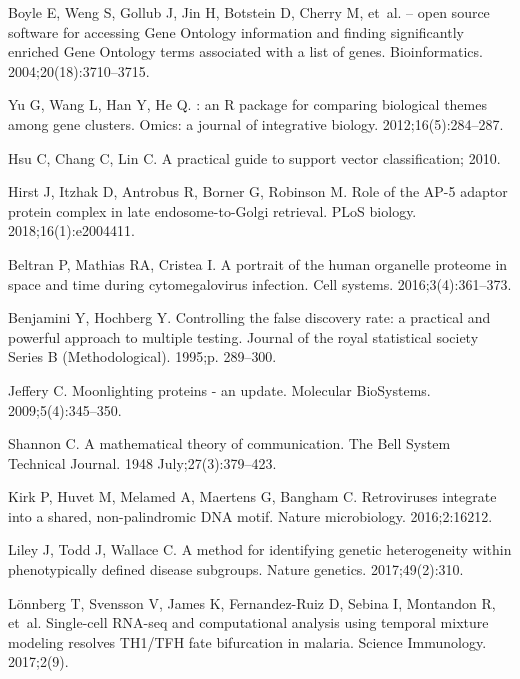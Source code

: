 \documentclass[10pt,letterpaper]{article}\usepackage[]{graphicx}\usepackage[]{color}
\begin{document}
\begin{thebibliography}{10}
Boyle E, Weng S, Gollub J, Jin H, Botstein D, Cherry M, et~al.
 {--} open source software for accessing Gene
  Ontology information and finding significantly enriched Gene Ontology terms
  associated with a list of genes.
\newblock Bioinformatics. 2004;20(18):3710--3715.

Yu G, Wang L, Han Y, He Q.
: an {R} package for comparing biological themes
  among gene clusters.
\newblock Omics: a journal of integrative biology. 2012;16(5):284--287.

Hsu C, Chang C, Lin C. A practical guide to support vector classification;
  2010.

Hirst J, Itzhak D, Antrobus R, Borner G, Robinson M.
\newblock Role of the AP-5 adaptor protein complex in late endosome-to-Golgi
  retrieval.
\newblock PLoS biology. 2018;16(1):e2004411.

Beltran P, Mathias RA, Cristea I.
\newblock A portrait of the human organelle proteome in space and time during
  cytomegalovirus infection.
\newblock Cell systems. 2016;3(4):361--373.

Benjamini Y, Hochberg Y.
\newblock Controlling the false discovery rate: a practical and powerful
  approach to multiple testing.
\newblock Journal of the royal statistical society Series B (Methodological).
  1995;p. 289--300.

Jeffery C.
\newblock Moonlighting proteins - an update.
\newblock Molecular BioSystems. 2009;5(4):345--350.

Shannon C.
\newblock A mathematical theory of communication.
\newblock The Bell System Technical Journal. 1948 July;27(3):379--423.

Kirk P, Huvet M, Melamed A, Maertens G, Bangham C.
\newblock Retroviruses integrate into a shared, non-palindromic DNA motif.
\newblock Nature microbiology. 2016;2:16212.

Liley J, Todd J, Wallace C.
\newblock A method for identifying genetic heterogeneity within phenotypically
  defined disease subgroups.
\newblock Nature genetics. 2017;49(2):310.

Lönnberg T, Svensson V, James K, Fernandez-Ruiz D, Sebina I, Montandon R,
  et~al.
\newblock Single-cell RNA-seq and computational analysis using temporal mixture
  modeling resolves TH1/TFH fate bifurcation in malaria.
\newblock Science Immunology. 2017;2(9).


\end{thebibliography}
\end{document}
